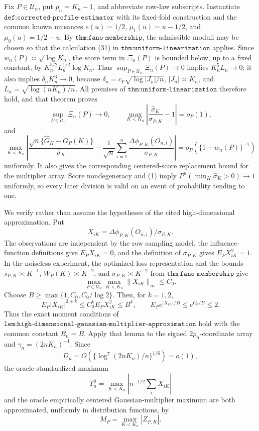 Fix \(P\in\mathcal U_n\), put \(p_n=K_n-1\), and abbreviate row-law subscripts.  Instantiate \(\texttt{def:corrected-profile-estimator}\) with its fixed-fold construction and the common known nuisances \(e(u)=1/2\), \(\mu_1(u)=u-1/2\), and \(\mu_0(u)=1/2-u\).  By \(\texttt{thm:fano-membership}\), the admissible moduli may be chosen so that the calculation (31) in \(\texttt{thm:uniform-linearization}\) applies.  Since \(w_n(P)\asymp\sqrt{\log K_n}\), the score term in \(\Xi_n(P)\) is bounded below, up to a fixed constant, by \(K_n^{5/2}L_n^{1/2}\log K_n\).  Thus \(\sup_{P\in\mathcal U_n}\Xi_n(P)\to0\) implies \(K_n^5L_n\to0\); it also implies \(\delta_nK_n^3\to0\), because \(\delta_n=c_{\mathrm F}\sqrt{\log|J_n|/n}\), \(|J_n|\asymp K_n\), and \(L_n=\sqrt{\log(nK_n)/n}\).  All premises of \(\texttt{thm:uniform-linearization}\) therefore hold, and that theorem proves
\[
 \sup_{P\in\mathcal U_n}\Xi_n(P)\to0,
 \qquad
 \max_{K<K_n}\left|\frac{\widehat\sigma_K}{\sigma_{P,K}}-1\right|=o_P(1),       \tag{1}
\]
and
\[
 \max_{K<K_n}\left|
 \frac{\sqrt n\{\widehat G_K-G_P(K)\}}{\widehat\sigma_K}
 -\frac1{\sqrt n}\sum_{i=1}^n\frac{\Delta\phi_{P,K}(O_{n,i})}{\sigma_{P,K}}
 \right|=o_P\!\left(\{1+w_n(P)\}^{-1}\right)                                  \tag{2}
\]
uniformly.  It also gives the corresponding centered-score replacement bound for the multiplier array.  Score nondegeneracy and (1) imply \(P^n(\min_K\widehat\sigma_K>0)\to1\) uniformly, so every later division is valid on an event of probability tending to one.

We verify rather than assume the hypotheses of the cited high-dimensional approximation.  Put
\[
 X_{iK}=\Delta\phi_{P,K}(O_{n,i})/\sigma_{P,K}.
\]
The observations are independent by the row sampling model, the influence-function definitions give \(E_PX_{iK}=0\), and the definition of \(\sigma_{P,K}\) gives \(E_PX_{iK}^2=1\).  In the noiseless experiment, the optimized-loss representation and the bounds \(s_{P,K}\asymp K^{-1}\), \(W_P(K)\asymp K^{-2}\), and \(\sigma_{P,K}\asymp K^{-2}\) from \(\texttt{thm:fano-membership}\) give
\[
 \max_{P\in\mathcal U_n}\max_{K<K_n}\|X_{iK}\|_\infty\leq C_0.               \tag{3}
\]
Choose \(B\geq\max\{1,C_0,C_0/\log2\}\).  Then, for \(k=1,2\),
\[
 E_P|X_{iK}|^{2+k}\leq C_0^kE_PX_{iK}^2\leq B^k,
 \qquad E_Pe^{|X_{iK}|/B}\leq e^{C_0/B}\leq2.                                  \tag{4}
\]
Thus the exact moment conditions of \(\texttt{lem:high-dimensional-gaussian-multiplier-approximation}\) hold with the common constant \(B_n=B\).  Apply that lemma to the signed \(2p_n\)-coordinate array and \(\gamma_n=(2nK_n)^{-1}\).  Since
\[
 D_n=O\!\left(\{\log^7(2nK_n)/n\}^{1/6}\right)=o(1),                            \tag{5}
\]
the oracle standardized maximum
\[
 T_n^0=\max_{K<K_n}\left|n^{-1/2}\sum_iX_{iK}\right|                           \tag{6}
\]
and the oracle empirically centered Gaussian-multiplier maximum are both approximated, uniformly in distribution functions, by
\[
 M_P=\max_{K<K_n}|Z_{P,K}|.                                                       \tag{7}
\]

